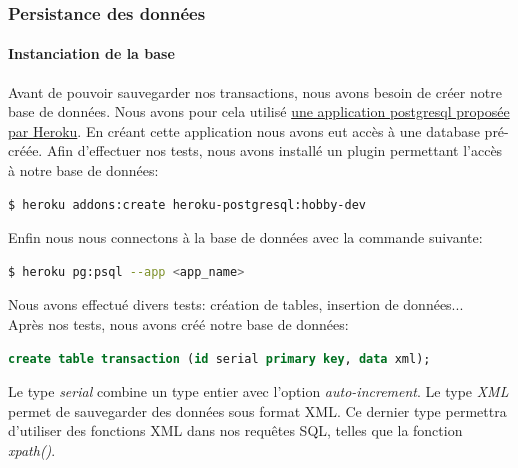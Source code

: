 \documentclass{article}
\begin{document}
      \subsubsection{Persistance des données}
	\paragraph{Instanciation de la base}
	  Avant de pouvoir sauvegarder nos transactions, nous avons besoin de créer notre base de données.
	  Nous avons pour cela utilisé \href{https://elements.heroku.com/addons/heroku-postgresql}{une application postgresql proposée par Heroku}.
	  En créant cette application nous avons eut accès à une database pré-créée.
	  Afin d'effectuer nos tests, nous avons installé un plugin permettant l'accès à notre base de données:
	  \begin{lstlisting}[language=bash]
    $ heroku addons:create heroku-postgresql:hobby-dev
	  \end{lstlisting}
	  Enfin nous nous connectons à la base de données avec la commande suivante:
	  \begin{lstlisting}[language=bash]
    $ heroku pg:psql --app <app_name>
	  \end{lstlisting}
	  Nous avons effectué divers tests: création de tables, insertion de données...\\
	  Après nos tests, nous avons créé notre base de données:
	  \begin{lstlisting}[language=sql]
    create table transaction (id serial primary key, data xml);
	  \end{lstlisting}
	  Le type \emph{serial} combine un type entier avec l'option \emph{auto-increment}. Le type \emph{XML} permet de sauvegarder des données sous format XML. Ce dernier type permettra 
	  d'utiliser des fonctions XML dans nos requêtes SQL, telles que la fonction \emph{xpath()}.
\end{document}

